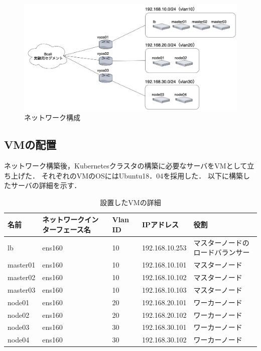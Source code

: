 \begin{figure}[htbp]
  \begin{center}
    \includegraphics[width=\textwidth]{./figures/implement-environment.png}
    \caption{ネットワーク構成}
  \end{center}
\end{figure}

\subsection{VMの配置}

ネットワーク構築後，Kubernetesクラスタの構築に必要なサーバをVMとして立ち上げた．
それぞれのVMのOSにはUbuntu18．04を採用した．
以下に構築したサーバの詳細を示す．

\begin{landscape}
  \begin{table}[htb]
    \begin{center}
      \caption{設置したVMの詳細}
      \begin{tabular}{|l|l|l|l|l|} \hline
        名前 & ネットワークインターフェース名 & Vlan ID & IPアドレス & 役割 \\ \hline
        lb & ens160 & 10 & 192.168.10.253 & マスターノードのロードバランサー \\ \hline
        master01 & ens160 & 10 & 192.168.10.101 & マスターノード \\ \hline
        master02 & ens160 & 10 & 192.168.10.102 & マスターノード \\ \hline
        master03 & ens160 & 10 & 192.168.10.103 & マスターノード \\ \hline
        node01 & ens160 & 20 & 192.168.20.101 & ワーカーノード \\ \hline
        node02 & ens160 & 20 & 192.168.20.102 & ワーカーノード \\ \hline
        node03 & ens160 & 30 & 192.168.30.101 & ワーカーノード \\ \hline
        node04 & ens160 & 30 & 192.168.30.102 & ワーカーノード \\ \hline
      \end{tabular}
    \end{center}
  \end{table}
\end{landscape}

